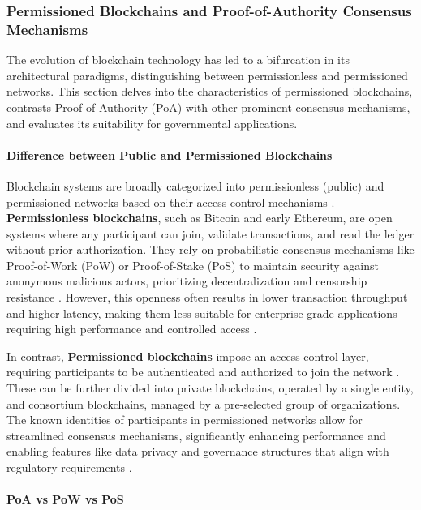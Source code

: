 \subsubsection{Permissioned Blockchains and Proof-of-Authority Consensus Mechanisms}

The evolution of blockchain technology has led to a bifurcation in its architectural paradigms, distinguishing between permissionless and permissioned networks. This section delves into the characteristics of permissioned blockchains, contrasts Proof-of-Authority (PoA) with other prominent consensus mechanisms, and evaluates its suitability for governmental applications.

\paragraph{Difference between Public and Permissioned Blockchains}

Blockchain systems are broadly categorized into permissionless (public) and permissioned networks based on their access control mechanisms \cite{und2026commledger}. \textbf{Permissionless blockchains}, such as Bitcoin and early Ethereum, are open systems where any participant can join, validate transactions, and read the ledger without prior authorization. They rely on probabilistic consensus mechanisms like Proof-of-Work (PoW) or Proof-of-Stake (PoS) to maintain security against anonymous malicious actors, prioritizing decentralization and censorship resistance \cite{mdpi2023survey}. However, this openness often results in lower transaction throughput and higher latency, making them less suitable for enterprise-grade applications requiring high performance and controlled access \cite{arxiv2024performance}.

In contrast, \textbf{Permissioned blockchains} impose an access control layer, requiring participants to be authenticated and authorized to join the network \cite{und2026commledger}. These can be further divided into private blockchains, operated by a single entity, and consortium blockchains, managed by a pre-selected group of organizations. The known identities of participants in permissioned networks allow for streamlined consensus mechanisms, significantly enhancing performance and enabling features like data privacy and governance structures that align with regulatory requirements \cite{mdpi2023unleashing}.

\paragraph{PoA vs PoW vs PoS}

